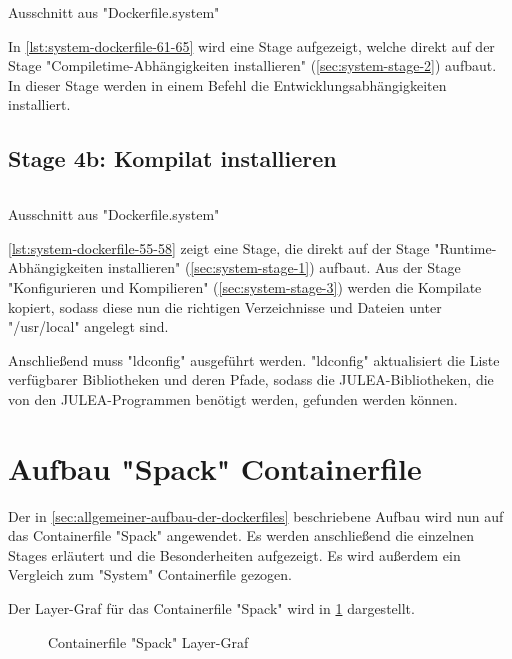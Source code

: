 \begin{listing}[H]
    \inputminted[firstline=61,lastline=65]{dockerfile}{./code-examples/Dockerfile.system}
    \caption{Ausschnitt aus "Dockerfile.system"}
    \label{lst:system-dockerfile-61-65}
\end{listing}

In \cref{lst:system-dockerfile-61-65} wird eine Stage aufgezeigt, welche direkt auf der Stage "Compiletime-Abhängigkeiten installieren" (\cref{sec:system-stage-2}) aufbaut. In dieser Stage werden in einem Befehl die Entwicklungsabhängigkeiten installiert.

\subsection{Stage 4b: Kompilat installieren} \label{sec:system-stage-4b}

\begin{listing}[H]
    \inputminted[firstline=55,lastline=58]{dockerfile}{./code-examples/Dockerfile.system}
    \caption{Ausschnitt aus "Dockerfile.system"}
    \label{lst:system-dockerfile-55-58}
\end{listing}

\cref{lst:system-dockerfile-55-58} zeigt eine Stage, die direkt auf der Stage "Runtime-Abhängigkeiten installieren" (\cref{sec:system-stage-1}) aufbaut. Aus der Stage "Konfigurieren und Kompilieren" (\cref{sec:system-stage-3}) werden die Kompilate kopiert, sodass diese nun die richtigen Verzeichnisse und Dateien unter "/usr/local" angelegt sind.

Anschließend muss "ldconfig" ausgeführt werden. "ldconfig" aktualisiert die Liste verfügbarer Bibliotheken und deren Pfade, sodass die JULEA-Bibliotheken, die von den JULEA-Programmen benötigt werden, gefunden werden können.

\pagebreak

\section{Aufbau "Spack" Containerfile}

Der in \cref{sec:allgemeiner-aufbau-der-dockerfiles} beschriebene Aufbau wird nun auf das Containerfile "Spack" angewendet. Es werden anschließend die einzelnen Stages erläutert und die Besonderheiten aufgezeigt. Es wird außerdem ein Vergleich zum "System" Containerfile gezogen.

Der Layer-Graf für das Containerfile "Spack" wird in \cref{fig:spack-layer-graph} dargestellt.
\begin{figure}[!htbp]
    \centering
    
    \caption{Containerfile "Spack" Layer-Graf}
    \label{fig:spack-layer-graph}
\end{figure}

